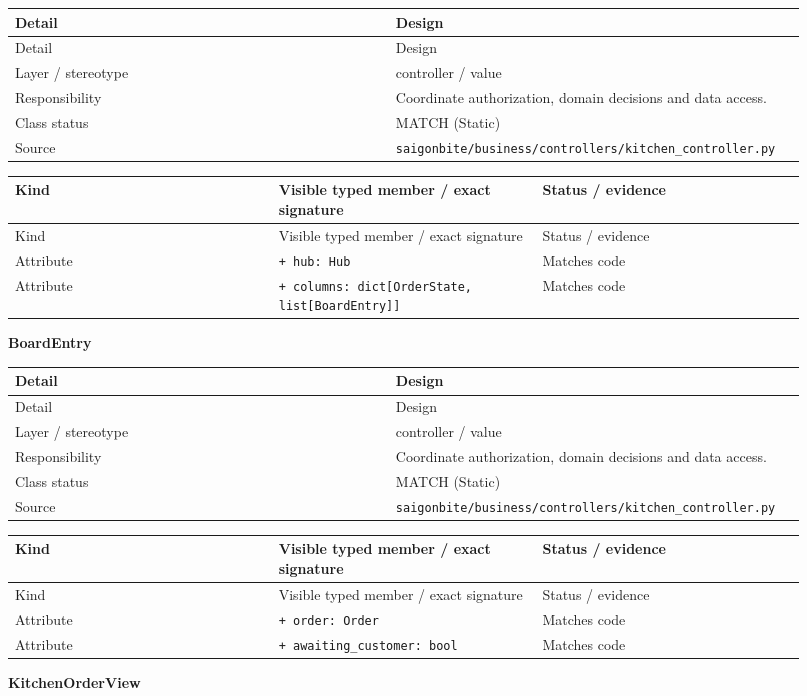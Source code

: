 \begin{longtable}{>{\raggedright\arraybackslash}p{0.4600\linewidth}>{\raggedright\arraybackslash}p{0.4600\linewidth}}
Detail & Design \\
\hline\endfirsthead
Detail & Design \\
\hline\endhead
Layer / stereotype & controller / \guillemotleft{}value\guillemotright{} \\
Responsibility & Coordinate authorization, domain decisions and data access. \\
Class status & MATCH (Static) \\
Source & \texttt{saigonbite/\allowbreak{}business/\allowbreak{}controllers/\allowbreak{}kitchen\_\allowbreak{}controller.\allowbreak{}py} \\
\end{longtable}
\begin{longtable}{>{\raggedright\arraybackslash}p{0.3067\linewidth}>{\raggedright\arraybackslash}p{0.3067\linewidth}>{\raggedright\arraybackslash}p{0.3067\linewidth}}
Kind & Visible typed member / exact signature & Status / evidence \\
\hline\endfirsthead
Kind & Visible typed member / exact signature & Status / evidence \\
\hline\endhead
Attribute & \texttt{+ hub: Hub} & Matches code \\
Attribute & \texttt{+ columns: dict[OrderState, list[BoardEntry]]} & Matches code \\
\end{longtable}
\textbf{BoardEntry}

\begin{longtable}{>{\raggedright\arraybackslash}p{0.4600\linewidth}>{\raggedright\arraybackslash}p{0.4600\linewidth}}
Detail & Design \\
\hline\endfirsthead
Detail & Design \\
\hline\endhead
Layer / stereotype & controller / \guillemotleft{}value\guillemotright{} \\
Responsibility & Coordinate authorization, domain decisions and data access. \\
Class status & MATCH (Static) \\
Source & \texttt{saigonbite/\allowbreak{}business/\allowbreak{}controllers/\allowbreak{}kitchen\_\allowbreak{}controller.\allowbreak{}py} \\
\end{longtable}
\begin{longtable}{>{\raggedright\arraybackslash}p{0.3067\linewidth}>{\raggedright\arraybackslash}p{0.3067\linewidth}>{\raggedright\arraybackslash}p{0.3067\linewidth}}
Kind & Visible typed member / exact signature & Status / evidence \\
\hline\endfirsthead
Kind & Visible typed member / exact signature & Status / evidence \\
\hline\endhead
Attribute & \texttt{+ order: Order} & Matches code \\
Attribute & \texttt{+ awaiting\_\allowbreak{}customer: bool} & Matches code \\
\end{longtable}
\textbf{KitchenOrderView}

